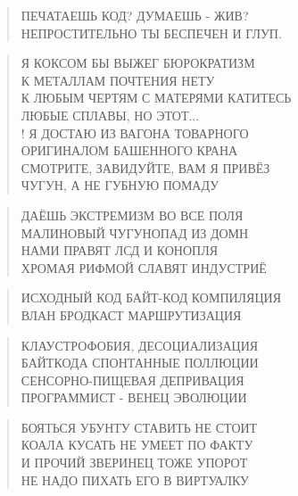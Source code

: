 \poemtitle{***}
\begin{verse}
ПЕЧАТАЕШЬ КОД? ДУМАЕШЬ - ЖИВ?\\
НЕПРОСТИТЕЛЬНО ТЫ БЕСПЕЧЕН И ГЛУП.
\end{verse}

\poemtitle{***}
\begin{verse}
Я КОКСОМ БЫ ВЫЖЕГ БЮРОКРАТИЗМ\\
К МЕТАЛЛАМ ПОЧТЕНИЯ НЕТУ\\
К ЛЮБЫМ ЧЕРТЯМ С МАТЕРЯМИ КАТИТЕСЬ\\
ЛЮБЫЕ СПЛАВЫ, НО ЭТОТ...\\!
Я ДОСТАЮ ИЗ ВАГОНА ТОВАРНОГО\\
ОРИГИНАЛОМ БАШЕННОГО КРАНА\\
СМОТРИТЕ, ЗАВИДУЙТЕ, ВАМ Я ПРИВЁЗ\\
ЧУГУН, А НЕ ГУБНУЮ ПОМАДУ
\end{verse}

\poemtitle{***}
\begin{verse}
ДАЁШЬ ЭКСТРЕМИЗМ ВО ВСЕ ПОЛЯ\\
МАЛИНОВЫЙ ЧУГУНОПАД ИЗ ДОМН\\
НАМИ ПРАВЯТ ЛСД И КОНОПЛЯ\\
ХРОМАЯ РИФМОЙ СЛАВЯТ ИНДУСТРИЁ
\end{verse}

\poemtitle{***}
\begin{verse}
ИСХОДНЫЙ КОД БАЙТ-КОД КОМПИЛЯЦИЯ\\
ВЛАН БРОДКАСТ МАРШРУТИЗАЦИЯ
\end{verse}

\poemtitle{***}
\begin{verse}
КЛАУСТРОФОБИЯ, ДЕСОЦИАЛИЗАЦИЯ\\
БАЙТКОДА СПОНТАННЫЕ ПОЛЛЮЦИИ\\
СЕНСОРНО-ПИЩЕВАЯ ДЕПРИВАЦИЯ\\
ПРОГРАММИСТ - ВЕНЕЦ ЭВОЛЮЦИИ
\end{verse}

\poemtitle{***}
\begin{verse}
БОЯТЬСЯ УБУНТУ СТАВИТЬ НЕ СТОИТ\\
КОАЛА КУСАТЬ НЕ УМЕЕТ ПО ФАКТУ\\
И ПРОЧИЙ ЗВЕРИНЕЦ ТОЖЕ УПОРОТ\\
НЕ НАДО ПИХАТЬ ЕГО В ВИРТУАЛКУ
\end{verse}

